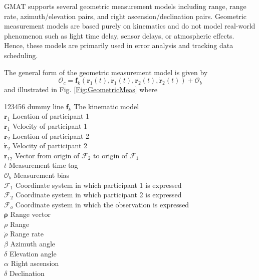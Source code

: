 GMAT supports several geometric measurement models including range,
range rate, azimuth/elevation pairs, and right ascension/declination
pairs.  Geometric measurement models are based purely on kinematics
and do not model real-world phenomenon such as light time delay,
sensor delays, or atmospheric effects.  Hence, these models are
primarily used in error analysis and tracking data scheduling.

The general form of the geometric measurement model is given by
%
\begin{equation}
   \mathcal{O}_c = \mathbf{f}_k\left(\mathbf{r}_1(t), \dot{\mathbf{r}}_1(t),
   \mathbf{r}_2(t), \dot{\mathbf{r}}_2(t)\right) + \mathcal{O}_b
\end{equation}
%
and illustrated in Fig. \ref{Fig:GeometricMeas} where
%
\begin{center}
    \begin{minipage}[t]{5.0 in}
        \begin{tabbing}[htbp!]
            123456 \= dummy line \kill
            $\mathbf{f}_k$ \> The kinematic model \\
            $\mathbf{r}_1$ \> Location of participant 1\\
            $\dot{\mathbf{r}}_1$ \> Velocity of participant 1\\
            $\mathbf{r}_2$ \> Location of participant 2\\
            $\dot{\mathbf{r}}_2$    \> Velocity of participant 2\\
            $\mathbf{r}_{12}$ \> Vector from origin of $\mathcal{F}_2$ to origin of $\mathcal{F}_1$\\
            $t$                \> Measurement time tag\\
            $\mathcal{O}_b$    \> Measurement bias\\
            $\mathcal{F}_1$ \> Coordinate system in which participant 1 is expressed\\
            $\mathcal{F}_2$ \> Coordinate system in which participant 2 is expressed\\
            $\mathcal{F}_o$ \> Coordinate system in which the observation is expressed\\
            $\boldsymbol{\rho}$    \> Range vector\\
            $\rho$   \>  Range   \\
            $\dot{\rho}$  \>  Range rate  \\
            $\beta$ \> Azimuth angle\\
            $\delta$ \> Elevation angle\\
            $\alpha$ \> Right ascension \\
            $\delta$ \> Declination \\
        \end{tabbing}
    \end{minipage}
\end{center}
